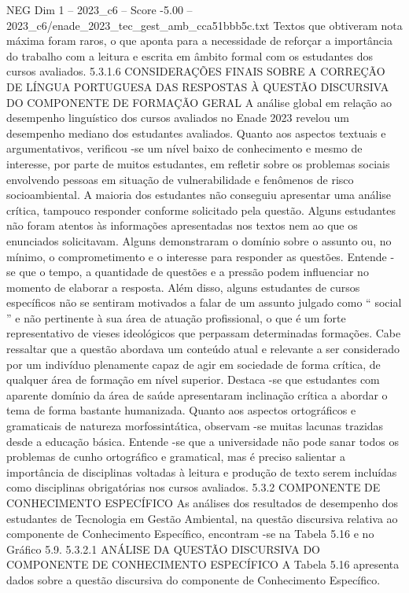 \begin{textsample}{NEG Dim 1 – 2023\_c6 – Score -5.00 – 2023\_c6/enade\_2023\_tec\_gest\_amb\_cca51bbb5c.txt}
Textos que obtiveram nota máxima foram raros, o que aponta para a necessidade de reforçar a importância do trabalho com a leitura e escrita em âmbito formal com os estudantes dos cursos avaliados. 5.3.1.6 CONSIDERAÇÕES FINAIS SOBRE A CORREÇÃO DE LÍNGUA PORTUGUESA DAS RESPOSTAS À QUESTÃO DISCURSIVA DO COMPONENTE DE FORMAÇÃO GERAL A análise global em relação ao desempenho linguístico dos cursos avaliados no Enade 2023 revelou um desempenho mediano dos estudantes avaliados.
Quanto aos aspectos textuais e argumentativos, verificou -se um nível baixo de conhecimento e mesmo de interesse, por parte de muitos estudantes, em refletir sobre os problemas sociais envolvendo pessoas em situação de vulnerabilidade e fenômenos de risco socioambiental.
A maioria dos estudantes não conseguiu apresentar uma análise crítica, tampouco responder conforme solicitado pela questão.
Alguns estudantes não foram atentos às informações apresentadas nos textos nem ao que os enunciados solicitavam.
Alguns demonstraram o domínio sobre o assunto ou, no mínimo, o comprometimento e o interesse para responder as questões.
Entende -se que o tempo, a quantidade de questões e a pressão podem influenciar no momento de elaborar a resposta.
Além disso, alguns estudantes de cursos específicos não se sentiram motivados a falar de um assunto julgado como “ social ” e não pertinente à sua área de atuação profissional, o que é um forte representativo de vieses ideológicos que perpassam determinadas formações.
Cabe ressaltar que a questão abordava um conteúdo atual e relevante a ser considerado por um indivíduo plenamente capaz de agir em sociedade de forma crítica, de qualquer área de formação em nível superior.
Destaca -se que estudantes com aparente domínio da área de saúde apresentaram inclinação crítica a abordar o tema de forma bastante humanizada.
Quanto aos aspectos ortográficos e gramaticais de natureza morfossintática, observam -se muitas lacunas trazidas desde a educação básica.
Entende -se que a universidade não pode sanar todos os problemas de cunho ortográfico e gramatical, mas é preciso salientar a importância de disciplinas voltadas à leitura e produção de texto serem incluídas como disciplinas obrigatórias nos cursos avaliados. 5.3.2 COMPONENTE DE CONHECIMENTO ESPECÍFICO As análises dos resultados de desempenho dos estudantes de Tecnologia em Gestão Ambiental, na questão discursiva relativa ao componente de Conhecimento Específico, encontram -se na Tabela 5.16 e no Gráfico 5.9. 5.3.2.1 ANÁLISE DA QUESTÃO DISCURSIVA DO COMPONENTE DE CONHECIMENTO ESPECÍFICO A Tabela 5.16 apresenta dados sobre a questão discursiva do componente de Conhecimento Específico.

\end{textsample}
